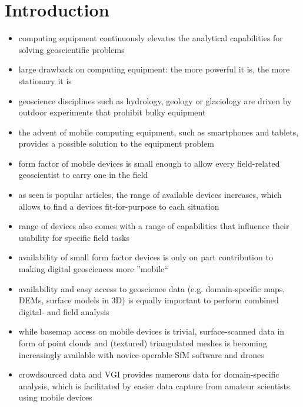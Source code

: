 \documentclass[review]{elsarticle}
\begin{document}
\linenumbers

\section{Introduction}
\label{sec:introduction}

\begin{itemize}
\item computing equipment continuously elevates the analytical capabilities for solving geoscientific problems
\item large drawback on computing equipment: the more powerful it is, the more stationary it is
\item geoscience disciplines such as hydrology, geology or glaciology are driven by outdoor experiments that prohibit bulky equipment
\item the advent of mobile computing equipment, such as smartphones and tablets, provides a possible solution to the equipment problem
\item form factor of mobile devices is small enough to allow every field-related geoscientist to carry one in the field
\item as seen is popular articles, the range of available devices increases, which allows to find a devices fit-for-purpose to each situation
\item range of devices also comes with a range of capabilities that influence their usability for specific field tasks
\end{itemize}

\begin{itemize}
\item availability of small form factor devices is only on part contribution to making digital geosciences more ''mobile``
\item availability and easy access to geoscience data (e.g. domain-specific maps, \glspl{DEM}, surface models in 3D) is equally important to perform combined digital- and field analysis
\item while basemap access on mobile devices is trivial, surface-scanned data in form of point clouds and (textured) triangulated meshes is becoming increasingly available with novice-operable \gls{SfM} software and drones
\item crowdsourced data and \gls{VGI} provides numerous data for domain-specific analysis, which is facilitated by easier data capture from amateur scientists using mobile devices
\end{itemize}
\end{document}
